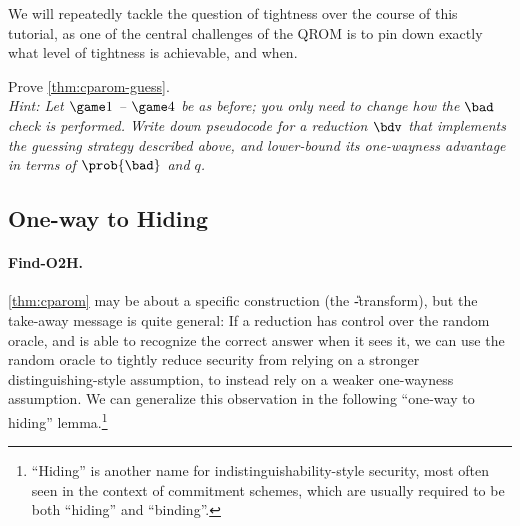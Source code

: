     We will repeatedly tackle the question of tightness over the course of
      this tutorial, as one of the central challenges of the QROM is to pin
      down exactly what level of tightness is achievable, and when.

  \begin{exercise}\label{ex:cparom-lossy}
    Prove \cref{thm:cparom-guess}.\\
    \emph{
      Hint: Let $\game 1$ -- $\game 4$ be as before; you only need to change how
      the $\bad$ check is performed. Write down pseudocode for a
      reduction $\bdv$ that implements the guessing strategy described above, and
      lower-bound its one-wayness advantage in terms of $\prob{\bad}$ and $q$.
    }
  \end{exercise}

\subsection{One-way to Hiding}\label{sec:C-O2H}
  \paragraph{Find-O2H.}
    \autoref{thm:cparom} may be about a specific construction (the
      \U-transform), but the take-away message is quite general: If a reduction
      has control over the random oracle, and is able to recognize the correct
      answer when it sees it, we can use the random oracle to tightly reduce
      security from relying on a stronger distinguishing-style assumption, to
      instead rely on a weaker one-wayness assumption. 
      We can generalize this observation in the following ``one-way to hiding'' lemma.\footnote{
        ``Hiding'' is another name for indistinguishability-style
        security, most often seen in the context of commitment schemes, which
        are usually required to be both ``hiding'' and ``binding''.
      }

